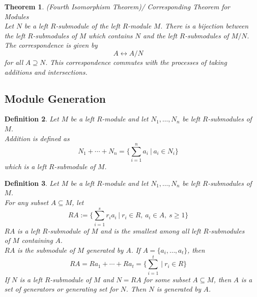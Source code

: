 \documentclass[a4paper,8pt]{article}
\newcommand{\hlt}[1]{\textit{{\color{blue}#1}}}
\theoremstyle{theorem}
\newtheorem{theorem}{Theorem}[subsection]
\newtheorem{definition}[theorem]{Definition}
\begin{document}
\begin{theorem}
\hlt{(Fourth Isomorphism Theorem)}/ Corresponding Theorem for Modules \\
Let $N$ be a left $R$-submodule of the left $R$-module $M$. There is a bijection between the left $R$-submodules of $M$ which contains $N$ and the left $R$-submodules of $M/N$. The correspondence is given by
\begin{equation}
A \leftrightarrow A/N \nonumber
\end{equation}
for all $A \supseteq N$. This correspondence commutes with the processes of taking additions and intersections.
\end{theorem}

\subsection{Module Generation}

\begin{definition}
Let $M$ be a left $R$-module and let $N_1, \ldots, N_n$ be left $R$-submodules of $M$.\\
\hlt{Addition} is defined as
\begin{equation}
N_1 + \cdots + N_n = \{\sum_{i=1}^n a_i \ | \ a_i \in N_i\} \nonumber
\end{equation}
which is a left $R$-submodule of $M$.
\end{definition}

\begin{definition}
Let $M$ be a left $R$-module and let $N_1, \ldots, N_n$ be left $R$-submodules of $M$.\\
For any subset $A \subseteq M$, let
\begin{equation}
RA := \{\sum_{i=1}^s r_i a_i \ | \ r_i \in R, \ a_i \in A, \ s \geq 1\} \nonumber
\end{equation}
$RA$ is a left $R$-submodule of $M$ and is the smallest among all left $R$-submodules of $M$ containing $A$.\\
$RA$ is the \hlt{submodule of $M$ generated by $A$}. If $A = \{a_i, \ldots, a_t\}$, then
\begin{equation}
RA = Ra_1 + \cdots + Ra_t = \{\sum_{i=1}^t \ | \ r_i \in R\} \nonumber
\end{equation}
If $N$ is a left $R$-submodule of $M$ and $N = RA$ for some subset $A \subseteq M$, then $A$ is a \hlt{set of generators} or \hlt{generating set for $N$}. Then $N$ is \hlt{generated by $A$}.
\end{definition}
\end{document}
